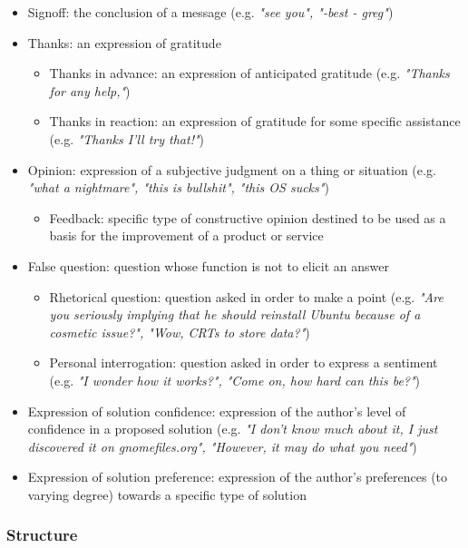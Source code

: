 \documentclass[11pt]{article}
\begin{document}
\begin{itemize}
\begin{itemize}
\begin{itemize}
				\end{itemize}
			\item Signoff: the conclusion of a message (e.g. \textit{"see you", "-best - greg"})
			\item Thanks: an expression of gratitude
				\begin{itemize}
					\item Thanks in advance: an expression of anticipated gratitude (e.g. \textit{"Thanks for any help,"})
					\item Thanks in reaction: an expression of gratitude for some specific assistance (e.g. \textit{"Thanks I'll try that!"})
				\end{itemize}
			\item Opinion: expression of a subjective judgment on a thing or situation (e.g. \textit{"what a nightmare", "this is bullshit", "this OS sucks"})
				\begin{itemize}
					\item Feedback: specific type of constructive opinion destined to be used as a basis for the improvement of a product or service
				\end{itemize}
			\item False question: question whose function is not to elicit an answer
				\begin{itemize}
					\item Rhetorical question: question asked in order to make a point (e.g. \textit{"Are you seriously implying that he should reinstall Ubuntu because of a cosmetic issue?", "Wow, CRTs to store data?"})
					\item Personal interrogation: question asked in order to express a sentiment (e.g. \textit{"I wonder how it works?", "Come on, how hard can this be?"})
				\end{itemize}
			\item Expression of solution confidence: expression of the author's level of confidence in a proposed solution (e.g. \textit{"I don't know much about it, I just discovered it on gnomefiles.org", "However, it may do what you need"})
			\item Expression of solution preference: expression of the author's preferences (to varying degree) towards a specific type of solution
		\end{itemize}
\end{itemize}

\subsubsection{Structure}
\end{document}
